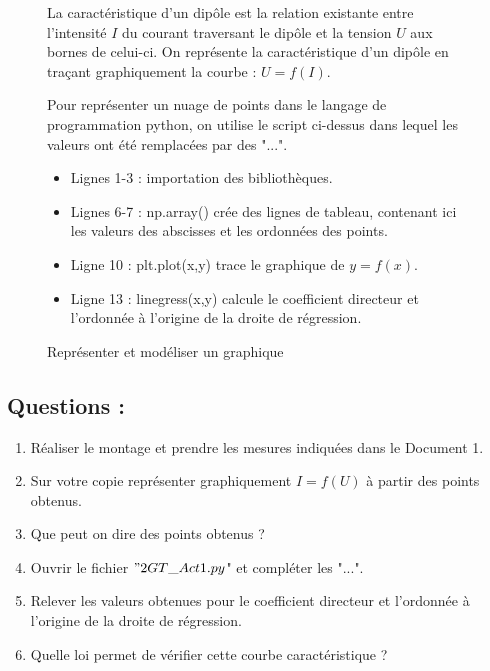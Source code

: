 \documentclass[a4paper,11pt,fleqn]{article}%
\begin{document}
\begin{figure}[h!]
	\begin{minipage}{.3\linewidth}
		\caption{Caractéristique d'un dipôle}
		La caractéristique d'un dipôle est la relation existante entre l'intensité $I$ du courant traversant le dipôle et la tension $U$ aux bornes de celui-ci. On représente la caractéristique  d'un dipôle en traçant graphiquement la courbe : $U = f(I)$.
	\end{minipage}\hspace{.04\linewidth}
	\begin{minipage}{.66\linewidth}
		\caption{Représenter et modéliser un graphique}
		

		Pour représenter un nuage de points dans le langage de programmation python, on utilise le script ci-dessus dans lequel les valeurs ont été remplacées par des "...".\\
		\begin{itemize}
			\item Lignes 1-3 : importation des bibliothèques.
			\item Lignes 6-7 : np.array() crée des lignes de tableau, contenant ici les valeurs des abscisses et les ordonnées des points.
			\item Ligne 10 : plt.plot(x,y) trace le graphique de $y=f(x)$.
			\item Ligne 13 : linegress(x,y) calcule le coefficient directeur et l'ordonnée à l'origine de la droite de régression.
		\end{itemize}
	\end{minipage}
\end{figure}

\newpage
\subsection*{Questions :}
\begin{enumerate}
	\item Réaliser le montage et prendre les mesures indiquées dans le Document 1.
	\item Sur votre copie représenter graphiquement $I=f(U)$ à partir des points obtenus.
	\item Que peut on dire des points obtenus ?
	\item Ouvrir le fichier $"2GT\_Act1.py$" et compléter les "...".
	\item Relever les valeurs obtenues pour le coefficient directeur et l'ordonnée à l'origine de la droite de régression.
	\item Quelle loi permet de vérifier cette courbe caractéristique ?
\end{enumerate}
\end{document}
